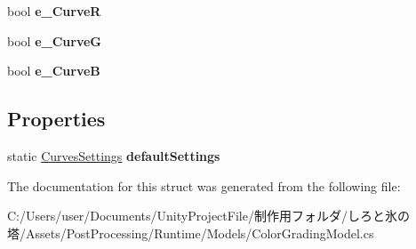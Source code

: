 \begin{DoxyCompactItemize}
bool {\bfseries e\+\_\+\+CurveR}
\item 
\mbox{\label{struct_unity_engine_1_1_post_processing_1_1_color_grading_model_1_1_curves_settings_a941a7a74f9734e7dbac6b33abf449ffd}} 
bool {\bfseries e\+\_\+\+CurveG}
\item 
\mbox{\label{struct_unity_engine_1_1_post_processing_1_1_color_grading_model_1_1_curves_settings_a1987d533cb917c5ab0fcc82a89a8b86f}} 
bool {\bfseries e\+\_\+\+CurveB}
\end{DoxyCompactItemize}
\subsection*{Properties}
\begin{DoxyCompactItemize}
\item 
\mbox{\label{struct_unity_engine_1_1_post_processing_1_1_color_grading_model_1_1_curves_settings_a64d1e8f2e606f4d9cbd3fb89ace3c93d}} 
static \hyperlink{struct_unity_engine_1_1_post_processing_1_1_color_grading_model_1_1_curves_settings}{Curves\+Settings} {\bfseries default\+Settings}
\end{DoxyCompactItemize}


The documentation for this struct was generated from the following file\+:\begin{DoxyCompactItemize}
\item 
C\+:/\+Users/user/\+Documents/\+Unity\+Project\+File/制作用フォルダ/しろと氷の塔/\+Assets/\+Post\+Processing/\+Runtime/\+Models/Color\+Grading\+Model.\+cs\end{DoxyCompactItemize}
